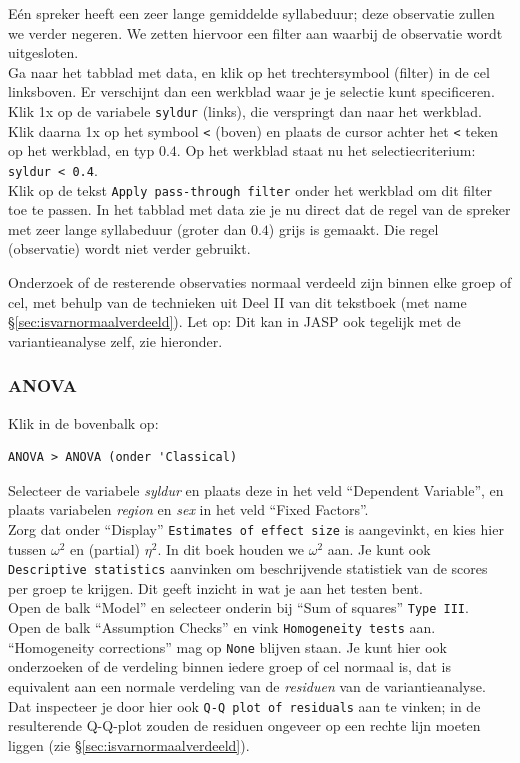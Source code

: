 \documentclass[
]{book}
\begin{document}
Eén spreker heeft een zeer lange gemiddelde syllabeduur; deze observatie
zullen we verder negeren. We zetten hiervoor een filter aan waarbij de observatie wordt uitgesloten.\\
Ga naar het tabblad met data, en klik op het trechtersymbool (filter) in de cel linksboven. Er verschijnt dan een werkblad waar je je selectie kunt specificeren.\\
Klik 1x op de variabele \texttt{syldur} (links), die verspringt dan naar het werkblad. Klik daarna 1x op het symbool \texttt{\textless{}} (boven) en plaats de cursor achter het \texttt{\textless{}} teken op het werkblad, en typ \(0.4\). Op het werkblad staat nu het selectiecriterium: \texttt{syldur\ \textless{}\ 0.4}.\\
Klik op de tekst \texttt{Apply\ pass-through\ filter} onder het werkblad om dit filter toe te passen. In het tabblad met data zie je nu direct dat de regel van de spreker met zeer lange syllabeduur (groter dan \(0.4\)) grijs is gemaakt. Die regel (observatie) wordt niet verder gebruikt.

Onderzoek of de resterende observaties normaal verdeeld zijn binnen elke groep of cel, met behulp van de technieken uit Deel II van dit tekstboek (met name
§\ref{sec:isvarnormaalverdeeld}). Let op: Dit kan in JASP ook tegelijk met de variantieanalyse zelf, zie hieronder.

\hypertarget{anova-3}{%
\subsubsection{ANOVA}\label{anova-3}}

Klik in de bovenbalk op:

\begin{verbatim}
ANOVA > ANOVA (onder 'Classical)
\end{verbatim}

Selecteer de variabele \emph{syldur} en plaats deze in het veld ``Dependent Variable'', en plaats variabelen \emph{region} en \emph{sex} in het veld ``Fixed Factors''.\\
Zorg dat onder ``Display'' \texttt{Estimates\ of\ effect\ size} is aangevinkt, en kies hier tussen \(\omega^2\) en (partial) \(\eta^2\). In dit boek houden we \(\omega^2\) aan. Je kunt ook \texttt{Descriptive\ statistics} aanvinken om beschrijvende statistiek van de scores per groep te krijgen. Dit geeft inzicht in wat je aan het testen bent.\\
Open de balk ``Model'' en selecteer onderin bij ``Sum of squares'' \texttt{Type\ III}.\\
Open de balk ``Assumption Checks'' en vink \texttt{Homogeneity\ tests} aan. ``Homogeneity corrections'' mag op \texttt{None} blijven staan. Je kunt hier ook onderzoeken of de verdeling binnen iedere groep of cel normaal is, dat is equivalent aan een normale verdeling van de \emph{residuen} van de variantieanalyse. Dat inspecteer je door hier ook \texttt{Q-Q\ plot\ of\ residuals} aan te vinken; in de resulterende Q-Q-plot zouden de residuen ongeveer op een rechte lijn moeten liggen (zie §\ref{sec:isvarnormaalverdeeld}).
\end{document}
